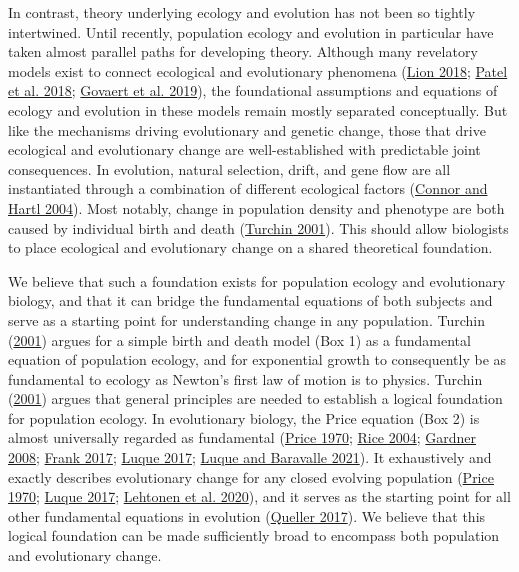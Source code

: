 \documentclass[
]{article}
\begin{document}
In contrast, theory underlying ecology and evolution has not been so
tightly intertwined. Until recently, population ecology and evolution in
particular have taken almost parallel paths for developing theory.
Although many revelatory models exist to connect ecological and
evolutionary phenomena (\protect\hyperlink{ref-Lion2018}{Lion 2018};
\protect\hyperlink{ref-Patel2018}{Patel et al. 2018};
\protect\hyperlink{ref-Govaert2019}{Govaert et al. 2019}), the
foundational assumptions and equations of ecology and evolution in these
models remain mostly separated conceptually. But like the mechanisms
driving evolutionary and genetic change, those that drive ecological and
evolutionary change are well-established with predictable joint
consequences. In evolution, natural selection, drift, and gene flow are
all instantiated through a combination of different ecological factors
(\protect\hyperlink{ref-Connor2004}{Connor and Hartl 2004}). Most
notably, change in population density and phenotype are both caused by
individual birth and death (\protect\hyperlink{ref-Turchin2001}{Turchin
2001}). This should allow biologists to place ecological and
evolutionary change on a shared theoretical foundation.

We believe that such a foundation exists for population ecology and
evolutionary biology, and that it can bridge the fundamental equations
of both subjects and serve as a starting point for understanding change
in any population. Turchin (\protect\hyperlink{ref-Turchin2001}{2001})
argues for a simple birth and death model (Box 1) as a fundamental
equation of population ecology, and for exponential growth to
consequently be as fundamental to ecology as Newton's first law of
motion is to physics. Turchin
(\protect\hyperlink{ref-Turchin2001}{2001}) argues that general
principles are needed to establish a logical foundation for population
ecology. In evolutionary biology, the Price equation (Box 2) is almost
universally regarded as fundamental
(\protect\hyperlink{ref-Price1970}{Price 1970};
\protect\hyperlink{ref-Rice2004}{Rice 2004};
\protect\hyperlink{ref-Gardner2008}{Gardner 2008};
\protect\hyperlink{ref-Frank2015a}{Frank 2017};
\protect\hyperlink{ref-Luque2016}{Luque 2017};
\protect\hyperlink{ref-Luque2021}{Luque and Baravalle 2021}). It
exhaustively and exactly describes evolutionary change for any closed
evolving population (\protect\hyperlink{ref-Price1970}{Price 1970};
\protect\hyperlink{ref-Luque2016}{Luque 2017};
\protect\hyperlink{ref-Lehtonen2020}{Lehtonen et al. 2020}), and it
serves as the starting point for all other fundamental equations in
evolution (\protect\hyperlink{ref-Queller2017}{Queller 2017}). We
believe that this logical foundation can be made sufficiently broad to
encompass both population and evolutionary change.
\end{document}
